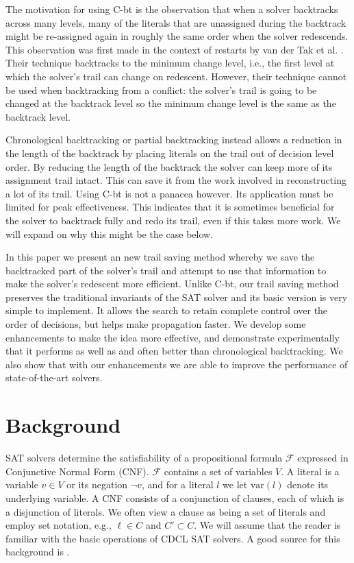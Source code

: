 \documentclass[runningheads]{llncs}
\newcommand{\sat}{SAT\xspace}
\newcommand{\var}{\text{var}}
\newcommand{\formula}{\ensuremath{\mathcal{F}}}
\newcommand{\cbt}{C-bt\xspace}
\begin{document}
The motivation for using \cbt is the observation that when a solver
backtracks across many levels, many of the literals that are
unassigned during the backtrack might be re-assigned again in roughly
the same order when the solver redescends. This observation was first
made in the context of restarts by van der Tak et
al. \cite{DBLP:journals/jsat/TakRH11}. Their technique backtracks to
the minimum change level, i.e., the first level at which the solver's
trail can change on redescent. However, their technique cannot be used
when backtracking from a conflict: the solver's trail is going to be
changed at the backtrack level so the minimum change level is the same
as the backtrack level. 

Chronological backtracking or partial backtracking instead allows a
reduction in the length of the backtrack by placing literals on the
trail out of decision level order. By reducing the length of the
backtrack the solver can keep more of its assignment trail
intact. This can save it from the work involved in reconstructing a
lot of its trail. Using \cbt is not a panacea however. Its application
must be limited for peak effectiveness. This indicates that it is
sometimes beneficial for the solver to backtrack fully and redo its
trail, even if this takes more work. We will expand on why this might
be the case below.

In this paper we present an new trail saving method whereby we save
the backtracked part of the solver's trail and attempt to use that
information to make the solver's redescent more efficient. Unlike
\cbt, our trail saving method preserves the traditional invariants of
the SAT solver and its basic version is very simple to implement. It
allows the search to retain complete control over the order of
decisions, but helps make propagation faster. We develop some
enhancements to make the idea more effective, and demonstrate
experimentally that it performs as well as and often better than
chronological backtracking. We also show that with our enhancements we
are able to improve the performance of state-of-the-art solvers.

\section{Background}
\label{sec:background}
\sat solvers determine the satisfiability of a propositional formula
$\formula$ expressed in Conjunctive Normal Form (CNF). $\formula$
contains a set of variables $V$. A literal is a variable $v\in V$ or
its negation $\lnot v$, and for a literal $l$ we let $\var(l)$ denote
its underlying variable. A CNF consists of a conjunction of clauses,
each of which is a disjunction of literals. We often view a clause as
being a set of literals and employ set notation, e.g., $\ell\in C$ and
$C'\subset C$. We will assume that the reader is familiar with the
basic operations of CDCL \sat solvers. A good source for this
background is \cite{DBLP:series/faia/SilvaLM09}.
\end{document}
